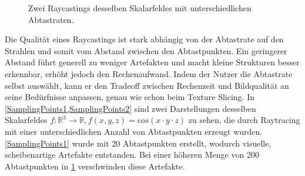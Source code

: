 \documentclass[a4paper,fontsize=12pt,toc=bib,parskip=half,ngerman]{scrartcl}
\begin{document}
\begin{figure}
\begin{minipage}{0.49\textwidth}
\begin{subfigure}{0.7\textwidth}
			\subcaption{}
			\label{SamplingPoints2}
		\end{subfigure}
	\end{minipage}
	\caption{Zwei Raycastings desselben Skalarfeldes mit unterschiedlichen Abtastraten.}
	\label{SamplingPoints}
\end{figure}

Die Qualit\"at eines Raycastings ist stark abh\"angig von der Abtastrate auf den Strahlen und somit vom Abstand zwischen den Abtastpunkten. Ein geringerer Abstand f\"uhrt generell zu weniger Artefakten und macht kleine Strukturen besser erkennbar, erh\"oht jedoch den Rechenaufwand. Indem der Nutzer die Abtastrate selbst ausw\"ahlt, kann er den Tradeoff zwischen Rechenzeit und Bildqualit\"at an seine Bed\"urfnisse anpassen, genau wie schon beim Texture Slicing. In \cref{SamplingPoints1,SamplingPoints2} sind zwei Darstellungen desselben Skalarfeldes $f:\mathbb{R}^3\rightarrow\mathbb{R}, f(x, y, z)=cos(x\cdot y\cdot z)$ zu sehen, die durch Raytracing mit einer unterschiedlichen Anzahl von Abtastpunkten erzeugt wurden. \cref{SamplingPoints1} wurde mit 20 Abtastpunkten erstellt, wodurch visuelle, scheibenartige Artefakte entstanden. Bei einer h\"oheren Menge von 200 Abtastpunkten in \cref{SamplingPoints2} verschwinden diese Artefakte.
\end{document}
